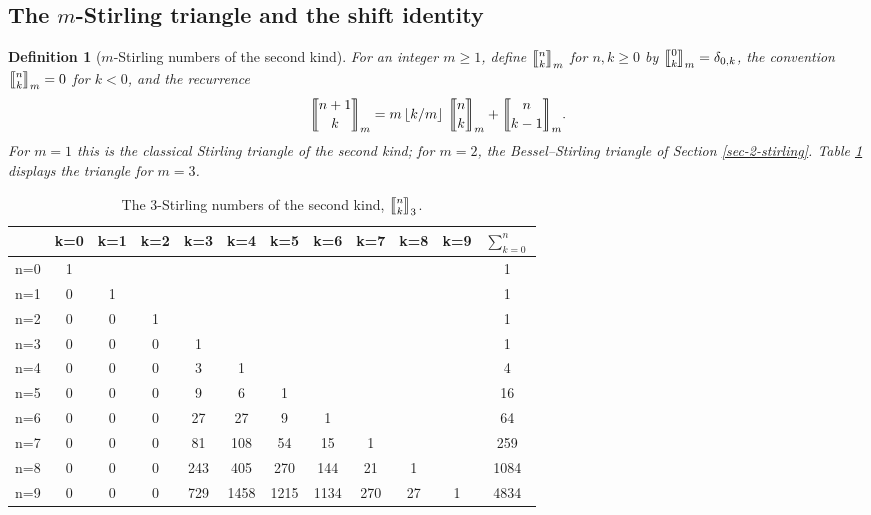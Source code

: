 \documentclass[a4paper]{amsart}
\numberwithin{equation}{section}
\newcommand{\mStirling}[0]{\genfrac{\llbracket}{\rrbracket}{0pt}{}}
\newcommand{\floor}[1]{\left\lfloor #1 \right\rfloor}
\newtheorem{definition}[theorem]{Definition}
\begin{document}
\subsection{The $m$-Stirling triangle and the shift identity}

\begin{definition}[$m$-Stirling numbers of the second kind]
For an integer $m \geq 1$, define $\mStirling{n}{k}_m$ for $n, k \geq 0$ by $\mStirling{0}{k}_m = \delta_{0,k}$, the convention $\mStirling{n}{k}_m = 0$ for $k < 0$, and the recurrence
\begin{equation}\label{eq-mstirling-recurrence}
\mStirling{n+1}{k}_m = m\floor{k/m} \, \mStirling{n}{k}_m + \mStirling{n}{k-1}_m.
\end{equation}
For $m = 1$ this is the classical Stirling triangle of the second kind; for $m=2$, the Bessel--Stirling triangle of Section \ref{sec-2-stirling}. Table \ref{tab-3stirling} displays the triangle for $m = 3$.
\end{definition}

\begin{table}[htbp]
    \centering
        \begin{tabular}{|l|*{10}{c}|c|}
        \hline
              & k=0 & k=1 & k=2 & k=3 & k=4 & k=5 & k=6 & k=7 & k=8 & k=9 & $\sum_{k=0}^{n}$ \\
        \hline
        n=0 & 1   &     &     &     &     &     &     &     &     &     & 1                \\
        n=1 & 0   & 1   &     &     &     &     &     &     &     &     & 1                \\
        n=2 & 0   & 0   & 1   &     &     &     &     &     &     &     & 1                \\
        n=3 & 0   & 0   & 0   & 1   &     &     &     &     &     &     & 1                \\
        n=4 & 0   & 0   & 0   & 3   & 1   &     &     &     &     &     & 4                \\
        n=5 & 0   & 0   & 0   & 9   & 6   & 1   &     &     &     &     & 16               \\
        n=6 & 0   & 0   & 0   & 27  & 27  & 9   & 1   &     &     &     & 64               \\
        n=7 & 0   & 0   & 0   & 81  & 108 & 54  & 15  & 1   &     &     & 259              \\
        n=8 & 0   & 0   & 0   & 243 & 405 & 270 & 144 & 21  & 1   &     & 1084             \\
        n=9 & 0   & 0   & 0   & 729 & 1458& 1215& 1134& 270 & 27  & 1   & 4834             \\
        \hline
        \end{tabular}
        \bigskip
    \caption{The $3$-Stirling numbers of the second kind, $\mStirling{n}{k}_3$.}
    \label{tab-3stirling}
\end{table}
\end{document}
